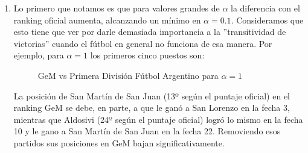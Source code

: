 \begin{enumerate}[parsep=1ex]
    \item Lo primero que notamos es que para valores grandes de $\alpha$ la
        diferencia con el ranking oficial aumenta, alcanzando un mínimo en
        $\alpha=0.1$. Consideramos que esto tiene que ver por darle demasiada
        importancia a la ''transitividad de victorias'' cuando el fútbol en
        general no funciona de esa manera. Por ejemplo, para $\alpha=1$ los
        primeros cinco puestos son:

        \begin{figure}[H]
            \centering
            \caption{GeM vs Primera Divisi\'on F\'utbol Argentino para $\alpha=1$}
            \label{fig:exp6_arg_1}
            \hspace{10pt}
        \end{figure}

        \par La posición de San Martín de San Juan (13º según el puntaje
        oficial) en el ranking GeM se debe, en parte, a que le ganó a San
        Lorenzo en la fecha 3, mientras que Aldosivi (24º según el puntaje
        oficial) logró lo mismo en la fecha 10 y le gano a San Martín de San
        Juan en la fecha 22. Removiendo esos partidos sus posiciones en GeM
        bajan significativamente.


\end{enumerate}

